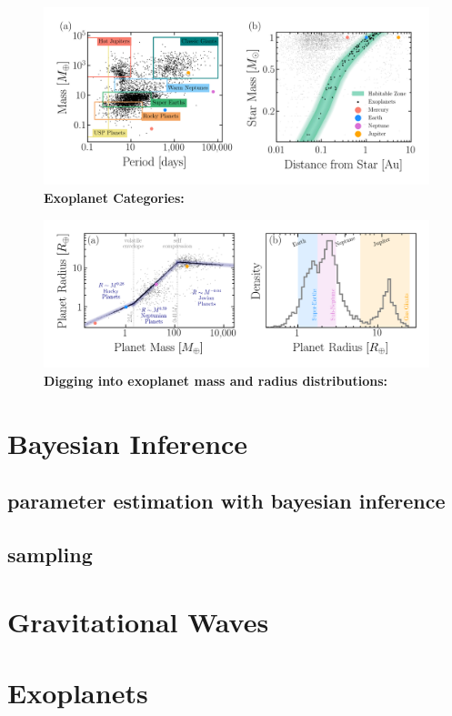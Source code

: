 \begin{figure}
\begin{center}
  \centerline{\includegraphics[width=1.\linewidth]{src/figures/scatter_categories.png}}
  \caption{\textbf{Exoplanet Categories:}  }
  \label{fig:exo_categories}
\end{center}
\end{figure}


\begin{figure}
\begin{center}
  \centerline{\includegraphics[width=1.\linewidth]{src/figures/radii_and_mass_relations.png}}
  \caption{\textbf{Digging into exoplanet mass and radius distributions:}  }
  \label{fig:exo_mass_radius_relations}
\end{center}
\end{figure}






\section{Bayesian Inference}

\subsection{parameter estimation with bayesian inference}

\subsection{sampling}


\section{Gravitational Waves}




\section{Exoplanets}
